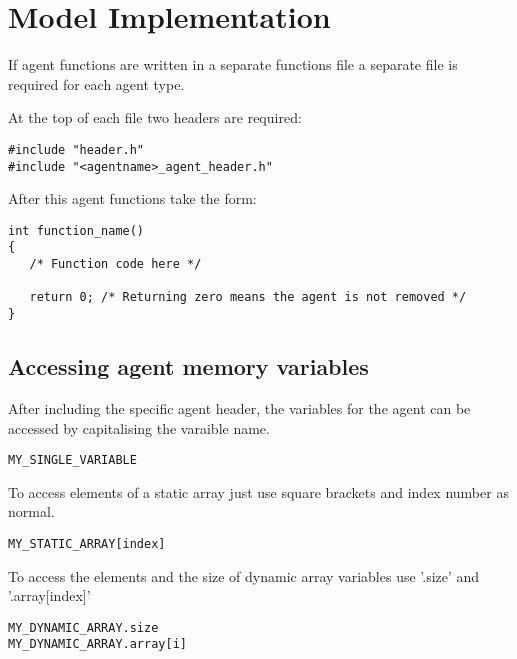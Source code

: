 \section{Model Implementation}

If agent functions are written in a separate functions file a separate file is required for each agent type.

At the top of each file two headers are required:

\begin{mylisting}
\begin{verbatim}
#include "header.h"
#include "<agentname>_agent_header.h"
\end{verbatim}
\end{mylisting}

After this agent functions take the form:

\begin{mylisting}
\begin{verbatim}
int function_name()
{
   /* Function code here */
   
   return 0; /* Returning zero means the agent is not removed */
}
\end{verbatim}
\end{mylisting}

\subsection{Accessing agent memory variables}

After including the specific agent header, the variables for the agent can be accessed by capitalising the varaible name.

\begin{mylisting}
\begin{verbatim}
MY_SINGLE_VARIABLE
\end{verbatim}
\end{mylisting}

To access elements of a static array just use square brackets and index number as normal.

\begin{mylisting}
\begin{verbatim}
MY_STATIC_ARRAY[index]
\end{verbatim}
\end{mylisting}

To access the elements and the size of dynamic array variables use '.size' and '.array[index]'

\begin{mylisting}
\begin{verbatim}
MY_DYNAMIC_ARRAY.size
MY_DYNAMIC_ARRAY.array[i]
\end{verbatim}
\end{mylisting}

